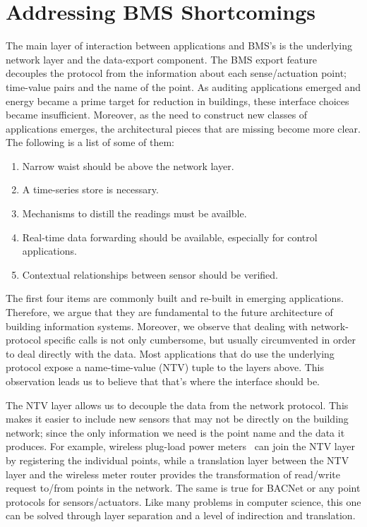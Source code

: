
\section{Addressing BMS Shortcomings}
\label{sec:shortcomings}
The main layer of interaction between applications and BMS's is the underlying network layer and the data-export component.  
The BMS export feature decouples the protocol from the information about each sense/actuation point; time-value
pairs and the name of the point. As auditing applications emerged and energy became a prime target for reduction in buildings, 
these interface choices became insufficient.  Moreover, as the need to construct new classes of applications emerges, the architectural
pieces that are missing become more clear.  The following is a list of some of them:

\begin{enumerate}
\item Narrow waist should be above the network layer. \label{nw}
\item A time-series store is necessary. \label{ts}
\item Mechanisms to distill the readings must be availble. \label{proc}
\item Real-time data forwarding should be available, especially for control applications. \label{rt}
\item Contextual relationships between sensor should be verified. \label{cntxt}
\end{enumerate}

The first four items are commonly built and re-built in emerging applications.  Therefore, we argue that they are fundamental 
to the future architecture of building information systems.  Moreover, we observe that dealing with network-protocol specific
calls is not only cumbersome, but usually circumvented in order to deal directly with the data.  Most applications that do
use the underlying protocol expose a name-time-value (NTV) tuple to the layers above.  This observation leads us to believe that
that's where the interface should be.

The NTV layer allows us to decouple the data from the network protocol.  This makes it easier to include 
new sensors that may not be directly on the building network; since the only information we need is the point name and the data it
produces.  For example, wireless plug-load power meters~\cite{acme}
can join the NTV layer by registering the individual points, while a translation layer between the NTV layer and the
wireless meter router provides the transformation of read/write request to/from points in the network.  The same is true for BACNet
or any point protocols for sensors/actuators.  Like many problems in computer science, this one can be solved through layer separation
and a level of indirection and translation.

